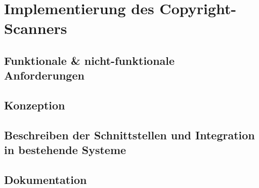 \chapter{Implementierung des Copyright-Scanners}\label{ch:copyright-scanner}

\section{Funktionale & nicht-funktionale Anforderungen}

\section{Konzeption}

\section{Beschreiben der Schnittstellen und Integration in bestehende Systeme}

\section{Dokumentation}

